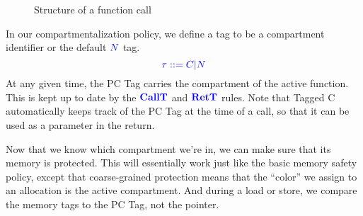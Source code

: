 \documentclass{llncs}
\begin{document}
\begin{figure}

  \caption{Structure of a function call}
  \label{fig:functions}
\end{figure}

In our compartmentalization policy, we define a tag to be a compartment identifier or
the default \({\color{blue} N}\) tag.
%
\[\color{blue} \tau ::= C | {\color{blue} N}\]
%
At any given time, the PC Tag carries the compartment of the active function.
This is kept up to date by the \(\color{blue} \mathbf{CallT}\) and \(\color{blue} \mathbf{RetT}\) rules. Note that
Tagged C automatically keeps track of the PC Tag at the time of a call, so that
it can be used as a parameter in the return.


Now that we know which compartment we're in, we can make sure that its memory is protected.
This will essentially work just like the basic memory safety policy, except that coarse-grained
protection means that the ``color'' we assign to an allocation is the active compartment.
And during a load or store, we compare the memory tags to the PC Tag, not the pointer.
\end{document}
